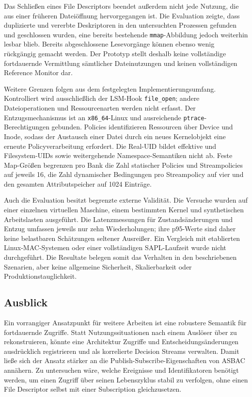 Das Schließen eines File Descriptors beendet außerdem nicht jede Nutzung, die aus einer früheren Dateiöffnung hervorgegangen ist. Die Evaluation zeigte, dass duplizierte und vererbte Deskriptoren in den untersuchten Prozessen gefunden und geschlossen wurden, eine bereits bestehende \texttt{mmap}-Abbildung jedoch weiterhin lesbar blieb. Bereits abgeschlossene Lesevorgänge können ebenso wenig rückgängig gemacht werden. Der Prototyp stellt deshalb keine vollständige fortdauernde Vermittlung sämtlicher Dateinutzungen und keinen vollständigen Reference Monitor dar.

Weitere Grenzen folgen aus dem festgelegten Implementierungsumfang. Kontrolliert wird ausschließlich der LSM-Hook \texttt{file\_open}; andere Dateioperationen und Ressourcenarten werden nicht erfasst. Der Entzugsmechanismus ist an \texttt{x86\_64}-Linux und ausreichende \texttt{ptrace}-Berechtigungen gebunden. Policies identifizieren Ressourcen über Device und Inode, sodass der Austausch einer Datei durch ein neues Kernelobjekt eine erneute Policyverarbeitung erfordert. Die Real-UID bildet effektive und Filesystem-UIDs sowie weitergehende Namespace-Semantiken nicht ab. Feste Map-Größen begrenzen pro Bank die Zahl statischer Policies und Streampolicies auf jeweils 16, die Zahl dynamischer Bedingungen pro Streampolicy auf vier und den gesamten Attributspeicher auf 1024 Einträge.

Auch die Evaluation besitzt begrenzte externe Validität. Die Versuche wurden auf einer einzelnen virtuellen Maschine, einem bestimmten Kernel und synthetischen Arbeitslasten ausgeführt. Die Latenzmessungen für Zustandsänderungen und Entzug umfassen jeweils nur zehn Wiederholungen; ihre p95-Werte sind daher keine belastbaren Schätzungen seltener Ausreißer. Ein Vergleich mit etablierten Linux-MAC-Systemen oder einer vollständigen SAPL-Laufzeit wurde nicht durchgeführt. Die Resultate belegen somit das Verhalten in den beschriebenen Szenarien, aber keine allgemeine Sicherheit, Skalierbarkeit oder Produktionstauglichkeit.

\subsection{Ausblick}

Ein vorrangiger Ansatzpunkt für weitere Arbeiten ist eine robustere Semantik für fortdauernde Zugriffe. Statt Nutzungssituationen nach einem Auslöser über  zu rekonstruieren, könnte eine Architektur Zugriffe und Entscheidungsänderungen ausdrücklich registrieren und als korrelierte Decision Streams verwalten. Damit ließe sich der Ansatz stärker an die Publish-Subscribe-Eigenschaften von ASBAC annähern. Zu untersuchen wäre, welche Ereignisse und Identifikatoren benötigt werden, um einen Zugriff über seinen Lebenszyklus stabil zu verfolgen, ohne einen File Descriptor selbst mit einer Subscription gleichzusetzen.


